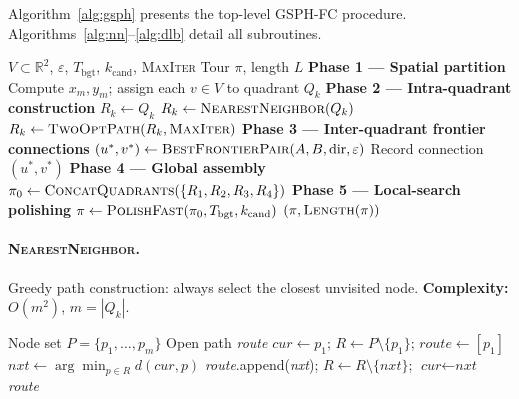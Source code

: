 \documentclass[runningheads]{llncs}
\begin{document}
Algorithm~\ref{alg:gsph} presents the top-level GSPH-FC procedure.
Algorithms~\ref{alg:nn}--\ref{alg:dlb} detail all subroutines.

\begin{algorithm}
\caption{GSPH-FC — Top-level procedure, $O(n^2)$}
\label{alg:gsph}
\begin{algorithmic}[1]
\Require $V\!\subset\!\mathbb{R}^2$, $\varepsilon$,
         $T_{\text{bgt}}$, $k_{\text{cand}}$, \textsc{MaxIter}
\Ensure  Tour $\pi$, length $L$
\State \textbf{Phase 1 — Spatial partition}
\State Compute $x_m, y_m$; assign each $v\in V$ to quadrant $Q_k$
\State \textbf{Phase 2 — Intra-quadrant construction}
  \; $R_k\gets Q_k$
  \Else
    \State $R_k\gets\Call{NearestNeighbor}{Q_k}$
      \State $R_k\gets\Call{TwoOptPath}{R_k,\textsc{MaxIter}}$
    \EndFor
  \EndIf
\EndFor
\State \textbf{Phase 3 — Inter-quadrant frontier connections}
  \State $(u^*,v^*)\gets\Call{BestFrontierPair}{A,B,\text{dir},\varepsilon}$
  \State Record connection $(u^*,v^*)$
\EndFor
\State \textbf{Phase 4 — Global assembly}
\State $\pi_0\gets\Call{ConcatQuadrants}{\{R_1,R_2,R_3,R_4\}}$
\State \textbf{Phase 5 — Local-search polishing}
\State $\pi\gets\Call{PolishFast}{\pi_0,T_{\text{bgt}},k_{\text{cand}}}$
\State \Return $(\pi,\Call{Length}{\pi})$
\end{algorithmic}
\end{algorithm}

\paragraph{\textsc{NearestNeighbor}.}
Greedy path construction: always select the closest unvisited node.
\textbf{Complexity:} $O(m^2)$, $m=|Q_k|$.

\begin{algorithm}
\caption{\textsc{NearestNeighbor} — Greedy path construction}
\label{alg:nn}
\begin{algorithmic}[1]
\Require Node set $P=\{p_1,\dots,p_m\}$
\Ensure  Open path \textit{route}
\State $\textit{cur}\gets p_1$;\;
       $R\gets P\setminus\{p_1\}$;\;
       $\textit{route}\gets[p_1]$
  \State $\textit{nxt}\gets\arg\min_{p\in R}d(\textit{cur},p)$
  \State \textit{route}.append(\textit{nxt});\;
         $R\gets R\setminus\{\textit{nxt}\}$;\;
         $\textit{cur}\gets\textit{nxt}$
\EndWhile
\State \Return \textit{route}
\end{algorithmic}
\end{algorithm}
\end{document}
